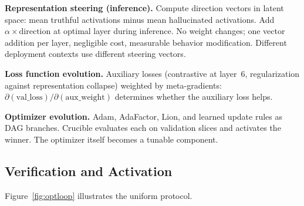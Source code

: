 \textbf{Representation steering (inference).}
Compute direction vectors in latent space: mean truthful activations minus mean hallucinated activations.
Add $\alpha \times \text{direction}$ at optimal layer during inference.
No weight changes; one vector addition per layer, negligible cost, measurable behavior modification.
Different deployment contexts use different steering vectors.

\textbf{Loss function evolution.}
Auxiliary losses (contrastive at layer~6, regularization against representation collapse) weighted by meta-gradients: $\partial(\text{val\_loss})/\partial(\text{aux\_weight})$ determines whether the auxiliary loss helps.

\textbf{Optimizer evolution.}
Adam, AdaFactor, Lion, and learned update rules as DAG branches.
Crucible evaluates each on validation slices and activates the winner.
The optimizer itself becomes a tunable component.

\subsection{Verification and Activation}

Figure~\ref{fig:optloop} illustrates the uniform protocol.

